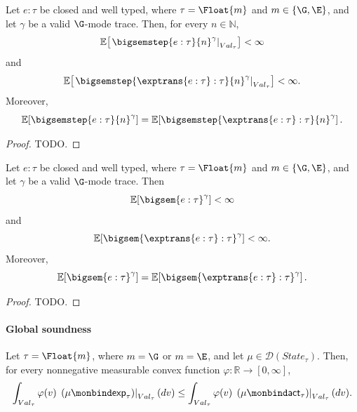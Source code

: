 \begin{theorem}
  \label{thm:tracewise-n-step-soundness}
  Let $e:\tau$ be closed and well typed, where
  $\tau=\Float{m}$ and $m\in\{\G,\E\}$, and let $\gamma$ be a valid
  $\G$-mode trace. Then, for every $n\in\mathbb N$, 
  \[
    \mathbb E\!\left[
      \left.\bigsemstep{e:\tau}{n}^{\gamma}\right|_{Val_\tau}
    \right] < \infty
  \]
  and
  \[
    \mathbb E\!\left[
      \left.
        \bigsemstep{\exptrans{e:\tau}:\tau}{n}^{\gamma}
      \right|_{Val_\tau}
    \right] < \infty.
  \]
  Moreover,
  \[
    \mathbb E\!\left[
      \bigsemstep{e:\tau}{n}^{\gamma}
    \right]
    =
    \mathbb E\!\left[
      \bigsemstep{\exptrans{e:\tau}:\tau}{n}^{\gamma}
    \right].
  \]
\end{theorem}

\begin{proof}
  TODO.
\end{proof}

\begin{theorem}
  \label{thm:tracewise-big-step-soundness}
  Let $e:\tau$ be closed and well typed, where
  $\tau=\Float{m}$ and $m\in\{\G,\E\}$, and let $\gamma$ be a valid
  $\G$-mode trace.
  Then
  \[
    \mathbb E\!\left[
      \bigsem{e:\tau}^{\gamma}
    \right]
    <
    \infty
  \]
  and
  \[
    \mathbb E\!\left[
      \bigsem{\exptrans{e:\tau}:\tau}^{\gamma}
    \right]
    <
    \infty.
  \]
  Moreover,
  \[
    \mathbb E\!\left[
      \bigsem{e:\tau}^{\gamma}
    \right]
    =
    \mathbb E\!\left[
      \bigsem{\exptrans{e:\tau}:\tau}^{\gamma}
    \right].
  \]
\end{theorem}


\begin{proof}
  TODO.
\end{proof}


\paragraph{Global soundness}

\begin{theorem}
  \label{thm:global-convex-domination}
  Let $\tau=\Float{m}$, where $m=\G$ or $m=\E$, and let $\mu \in \mathcal{D}(State_\tau)$. Then, for every nonnegative measurable convex function
  $\varphi:\mathbb R\to[0,\infty]$,
  \[
    \int_{Val_\tau}
      \varphi(v)\,
      \left.
        (\mu\monbind\mathsf{exp}_\tau)
      \right|_{Val_\tau}(dv)
    \leq
    \int_{Val_\tau}
      \varphi(v)\,
      \left.
        (\mu\monbind\mathsf{act}_\tau)
      \right|_{Val_\tau}(dv).
  \]
\end{theorem}

